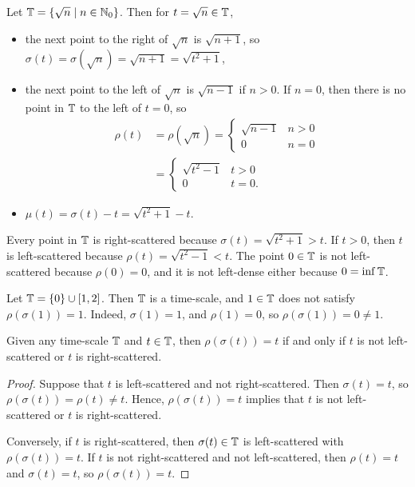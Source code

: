 \documentclass[nonumber]{homework}
\begin{document}
	\maketitle
	
	Let $\mathbb{T} = \{\sqrt{n} \mid n \in \mathbb{N}_0\}$. Then for $t = \sqrt{n} \in \mathbb{T}$,
	\begin{itemize}
		\item the next point to the right of $\sqrt{n}$ is $\sqrt{n+1}$, so $\sigma(t) = \sigma(\sqrt{n}) = \sqrt{n+1} = \sqrt{t^2 + 1}$,
		\item the next point to the left of $\sqrt{n}$ is $\sqrt{n-1}$ if $n > 0$. If $n = 0$, then there is no point in $\mathbb{T}$ to the left of $t=0$, so
		\begin{align*}
			\rho(t) &= \rho(\sqrt{n}) = \begin{cases}
				\sqrt{n-1} & n > 0 \\
				0 & n = 0
			\end{cases}\\
			&= \begin{cases}
				\sqrt{t^2-1} & t > 0 \\
				0 & t = 0.
			\end{cases}
		\end{align*}
		\item $\mu(t) = \sigma(t) - t = \sqrt{t^2 + 1} - t$.
	\end{itemize}
	Every point in $\mathbb{T}$ is right-scattered because $\sigma(t) = \sqrt{t^2 + 1} > t$. If $t > 0$, then $t$ is left-scattered because $\rho(t) = \sqrt{t^2-1} < t$. The point $0 \in \mathbb{T}$ is not left-scattered because $\rho(0) =0$, and it is not left-dense either because $0 = \inf \mathbb{T}$.
	
	Let $\mathbb{T} = \{0\} \cup [1,2]$. Then $\mathbb{T}$ is a time-scale, and $1 \in \mathbb{T}$ does not satisfy $\rho(\sigma(1)) = 1$. Indeed, $\sigma(1) = 1$, and $\rho(1) = 0$, so $\rho(\sigma(1)) = 0 \ne 1$.
	
	Given any time-scale $\mathbb{T}$ and $t \in \mathbb{T}$, then $\rho(\sigma(t)) = t$ if and only if $t$ is not left-scattered or $t$ is right-scattered.
	
	\begin{proof}
		Suppose that $t$ is left-scattered and not right-scattered. Then $\sigma(t) = t$, so $\rho(\sigma(t)) = \rho(t) \ne t$. Hence, $\rho(\sigma(t))=t$ implies that $t$ is not left-scattered or $t$ is right-scattered.
		
		Conversely, if $t$ is right-scattered, then $\sigma(t) \in \mathbb{T}$ is left-scattered with $\rho(\sigma(t)) = t$. If $t$ is not right-scattered and not left-scattered, then $\rho(t) = t$ and $\sigma(t) = t$, so $\rho(\sigma(t)) = t$.
	\end{proof}
	
\end{document}
